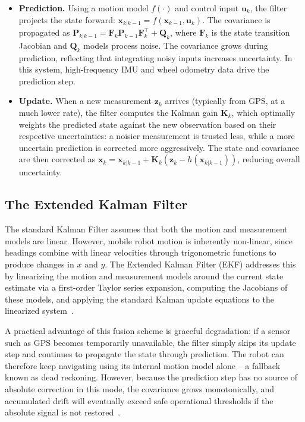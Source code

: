 \begin{itemize}
    \item \textbf{Prediction.} Using a motion model $f(\cdot)$ and control input $\mathbf{u}_k$, the filter projects the state forward: $\mathbf{x}_{k|k-1} = f(\mathbf{x}_{k-1}, \mathbf{u}_k)$. The covariance is propagated as $\mathbf{P}_{k|k-1} = \mathbf{F}_k \mathbf{P}_{k-1} \mathbf{F}_k^\top + \mathbf{Q}_k$, where $\mathbf{F}_k$ is the state transition Jacobian and $\mathbf{Q}_k$ models process noise. The covariance grows during prediction, reflecting that integrating noisy inputs increases uncertainty. In this system, high-frequency IMU and wheel odometry data drive the prediction step.
    \item \textbf{Update.} When a new measurement $\mathbf{z}_k$ arrives (typically from GPS, at a much lower rate), the filter computes the Kalman gain $\mathbf{K}_k$, which optimally weights the predicted state against the new observation based on their respective uncertainties: a noisier measurement is trusted less, while a more uncertain prediction is corrected more aggressively. The state and covariance are then corrected as $\mathbf{x}_k = \mathbf{x}_{k|k-1} + \mathbf{K}_k(\mathbf{z}_k - h(\mathbf{x}_{k|k-1}))$, reducing overall uncertainty.
\end{itemize}

\subsection{The Extended Kalman Filter}
\label{subsec:ekf}

The standard Kalman Filter assumes that both the motion and measurement models are linear. However, mobile robot motion is inherently non-linear, since headings combine with linear velocities through trigonometric functions to produce changes in $x$ and $y$. The Extended Kalman Filter (EKF) addresses this by linearizing the motion and measurement models around the current state estimate via a first-order Taylor series expansion, computing the Jacobians of these models, and applying the standard Kalman update equations to the linearized system~\cite{moore2015ekf}.

A practical advantage of this fusion scheme is graceful degradation: if a sensor such as GPS becomes temporarily unavailable, the filter simply skips its update step and continues to propagate the state through prediction. The robot can therefore keep navigating using its internal motion model alone -- a fallback known as dead reckoning. However, because the prediction step has no source of absolute correction in this mode, the covariance grows monotonically, and accumulated drift will eventually exceed safe operational thresholds if the absolute signal is not restored~\cite{brossard2020aiimu}.

